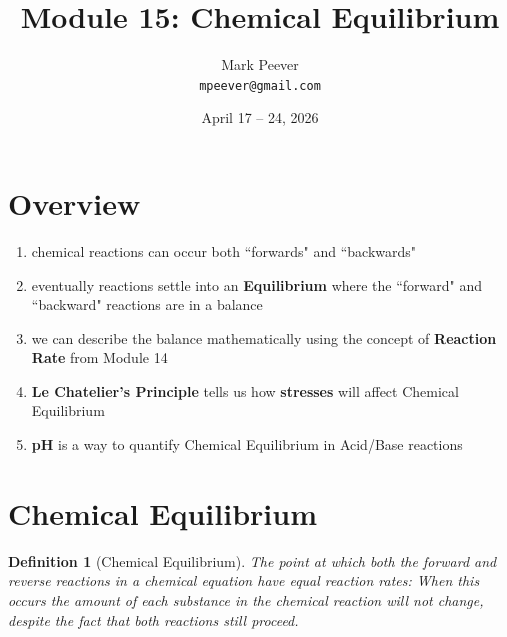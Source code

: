 \documentclass[11pt, oneside]{article}   	%
\title{Module 15: Chemical Equilibrium}
\author{Mark Peever\\ \texttt{mpeever@gmail.com}}
\date{April 17 -- 24, 2026}
\newtheorem{definition}{Definition}
\begin{document}
\maketitle

\section{Overview}
\begin{enumerate}
\item chemical reactions can occur both ``forwards" and ``backwards"
\item eventually reactions settle into an \textbf{Equilibrium} where the ``forward" and ``backward" reactions are in a balance
\item we can describe the balance mathematically using the concept of \textbf{Reaction Rate} from Module 14
\item \textbf{Le Chatelier's Principle} tells us how \textbf{stresses} will affect Chemical Equilibrium
\item \textbf{pH} is a way to quantify Chemical Equilibrium in Acid/Base reactions
\end{enumerate}

\section{Chemical Equilibrium}
\begin{definition}[Chemical Equilibrium]\label{defn:chemical-equilibrium}
The point at which both the forward and reverse reactions in a chemical equation have equal reaction rates:
When this occurs the amount of each substance in the chemical reaction will not change, despite the fact that both reactions still proceed.
\end{definition}
\end{document}
